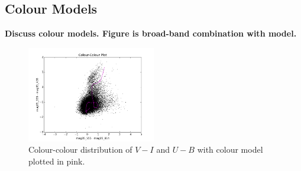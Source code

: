 \subsection{Colour Models}
\textbf{Discuss colour models. Figure is broad-band combination with model.}

\begin{figure}
\label{fig:model_colour}
\centering
\includegraphics[width=0.5\textwidth]{figs/data/plot_mag05_555-mag05_814vsmag05_336-mag05_438}
\caption{Colour-colour distribution of $V - I$ and $U - B$ with colour model plotted in pink.}
\end{figure}



